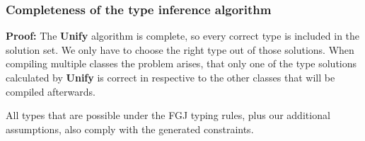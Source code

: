 \documentclass[runningheads]{llncs}
\begin{document}
\subsubsection{Completeness of the type inference algorithm}
\textbf{Proof:} The \textbf{Unify} algorithm is complete, so every correct type is included in the solution set.
We only have to choose the right type out of those solutions.
When compiling multiple classes the problem arises,
that only one of the type solutions calculated by \textbf{Unify} is correct
in respective to the other classes that will be compiled afterwards.

All types that are possible under the FGJ typing rules, plus our additional assumptions,
also comply with the generated constraints.
\end{document}
